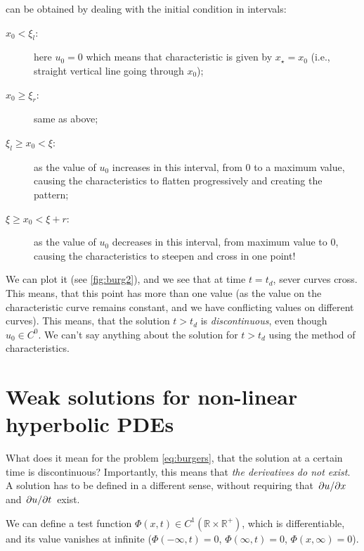 \documentclass[justified, nobib, a4page]{tufte-handout}
\begin{document}
 can be obtained by dealing with the
initial condition in intervals:
\begin{description}
	\item[\(x_0 < \xi_l\):] here \(u_0 = 0\) which means that characteristic is
	      given by \(x_\star = x_0\) (i.e., straight vertical line going through \(x_0\));
	\item[\(x_0 \geq \xi_r\):] same as above;
	\item[\(\xi_l \geq x_0 < \xi\):] as the value of \(u_0\) increases in this interval, from
	      0 to a maximum value, causing the characteristics to flatten progressively and creating the
	       pattern;
	\item[\(\xi \geq x_0 < \xi+r\):] as the value of \(u_0\) decreases in this interval, from
	      maximum value to 0, causing the characteristics to steepen and cross in one point!
\end{description}
We can plot it (see \cref{fig:burg2}), and we see that at time \(t=t_d\), sever
curves cross. This means, that this point has more than one value (as the value
on the characteristic curve remains constant, and we have conflicting values on
different curves). This means, that the solution \(t>t_d\) is \emph{discontinuous},
even though \(u_0 \in C^0\). We can't say anything about the solution for \(t>t_d\)
using the method of characteristics.

\section{Weak solutions for non-linear hyperbolic PDEs}
What does it mean for the problem \cref{eq:burgers}, that the solution at a
certain time is discontinuous? Importantly, this means that \emph{the
	derivatives do not exist}. A solution has to be defined in a different
sense, without requiring that \(\pdv{u}/{x}\) and \(\pdv{u}/{t}\) exist.

We can define a test function \(\Phi(x,t)\in
C^1(\mathbb{R}\times\mathbb{R}^+)\), which is differentiable, and its value
vanishes at infinite (\(\Phi(-\infty, t) = 0\), \(\Phi(\infty, t) = 0\),
\(\Phi(x, \infty) = 0\)).
\end{document}
